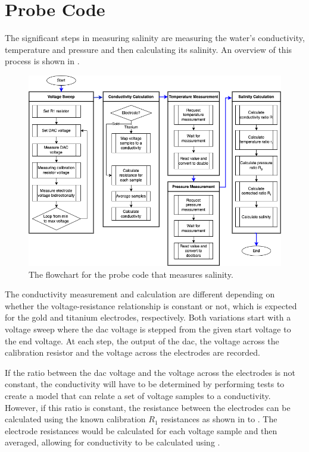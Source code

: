 \section{Probe Code}

The significant steps in measuring salinity are measuring the water's conductivity, temperature and pressure and then calculating its salinity.
An overview of this process is shown in .

\begin{figure}[ht]
    \centering
    \includegraphics[width=1\textwidth]{Figures/probe_flowchart}
    \caption{The flowchart for the probe code that measures salinity.}
    \label{fig:probe-code-flowchart} %
\end{figure}

The conductivity measurement and calculation are different depending on whether the voltage-resistance relationship is constant or not, which is expected for the gold and titanium electrodes, respectively.
Both variations start with a voltage sweep where the \gls{dac} voltage is stepped from the given start voltage to the end voltage.
At each step, the output of the \gls{dac}, the voltage across the calibration resistor and the voltage across the electrodes are recorded.

If the ratio between the \gls{dac} voltage and the voltage across the electrodes is not constant, the conductivity will have to be determined by performing tests to create a model that can relate a set of voltage samples to a conductivity. 
However, if this ratio is constant, the resistance between the electrodes can be calculated using the known calibration $R_1$ resistances as shown in  to .
The electrode resistances would be calculated for each voltage sample and then averaged, allowing for conductivity to be calculated using .

